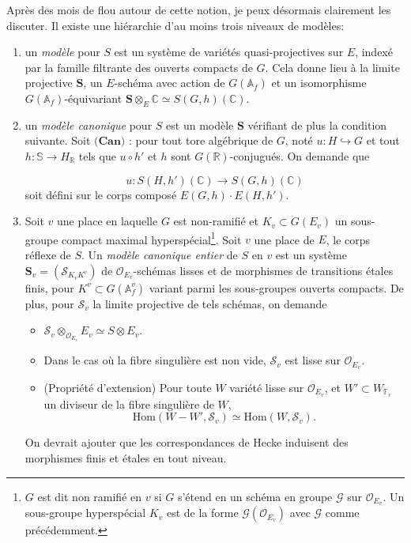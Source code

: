 \documentclass[11.8pt]{amsart}
\newcommand\C{\mathbb C}
\newcommand\Hom{\mathrm{Hom}}
\theoremstyle{plain}
\theoremstyle{definition}
\theoremstyle{remark}
\begin{document}
Après des mois de flou autour de cette notion, je peux désormais clairement les discuter. Il existe une hiérarchie d'au moins trois niveaux de modèles: \begin{enumerate}\item un \textit{modèle} pour $S$ est un système de variétés quasi-projectives sur $E$, indexé par la famille filtrante des ouverts compacts de $G$. Cela donne lieu à la limite projective $\mathbf S$, un $E$-schéma avec action de $G(\mathbb A_f)$ et un isomorphisme $G(\mathbb A_f)$-équivariant $\mathbf S\otimes_E \C \simeq S(G,h)(\C)$. \item un \textit{modèle canonique} pour $S$ est un modèle $\mathbf S$ vérifiant de plus la condition suivante. Soit $\textbf{(Can)}$ : pour tout tore algébrique de $G$, noté $u:H\hookrightarrow G$ et tout $h:\mathbb S \to H_\mathbb R$ tels que $u\circ h'$ et $h$ sont $G(\mathbb R)$-conjugués. On demande que

$$u : S(H,h')(\C) \to S(G,h)(\C)$$
soit défini sur le corps composé $E(G,h)\cdot E(H,h')$.
\item Soit $v$ une place en laquelle $G$ est non-ramifié et $K_v\subset G(E_v)$ un sous-groupe compact maximal hyperspécial\footnote{$G$ est dit non ramifié en $v$ si $G$ s'étend en un schéma en groupe $\mathcal G$ sur $\mathcal O_{E_v}$. Un sous-groupe hyperspécial $K_v$ est de la forme $\mathcal G(\mathcal O_{E_v})$ avec $\mathcal G$ comme précédemment.}. Soit $v$ une place de $E$, le corps réflexe de $S$. Un \textit{modèle canonique entier} de $S$ en $v$ est un système $\mathbf S_v = (\mathcal S_{K_vK^v})$ de $\mathcal O_{E_v}$-schémas lisses et de morphismes de transitions étales finis, pour $K^v\subset G(\mathbb A_f^v)$ variant parmi les sous-groupes ouverts compacts. De plus, pour $\mathcal S_v$ la limite projective de tels schémas, on demande \begin{itemize}
\item $\mathcal S_v \otimes_{\mathcal O_{E_v}} E_v \simeq S \otimes E_v$.
\item Dans le cas où la fibre singulière est non vide, $\mathcal S_v$ est lisse sur $\mathcal O_{E_v}$.
\item (Propriété d'extension) Pour toute $W$ variété lisse sur $\mathcal O_{E_v}$, et $W'\subset W_{\mathbb F_v}$ un diviseur de la fibre singulière de $W$, $$\Hom(W-W',\mathcal S_v) \simeq \Hom(W, \mathcal S_v).$$ 
\end{itemize}

On devrait ajouter que les correspondances de Hecke induisent des morphismes finis et étales en tout niveau.


\end{enumerate}
\end{document}
